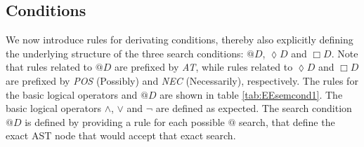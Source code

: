 \subsection*{Conditions}
We now introduce rules for derivating conditions, thereby also explicitly defining the underlying structure of the three search conditions: $@ D$, $\lozenge D$ and $\Box D$. Note that rules related to $@D$ are prefixed by \textit{AT}, while rules related to $\lozenge D$ and $\Box D$ are prefixed by \textit{POS} (Possibly) and \textit{NEC} (Necessarily), respectively. The rules for the basic logical operators and $@ D$ are shown in table \ref{tab:EEsemcond1}. The basic logical operators $\land$, $\lor$ and $\neg$ are defined as expected. The search condition $@D$ is defined by providing a rule for each possible $@$ search, that define the exact AST node that would accept that exact search.\\
%
